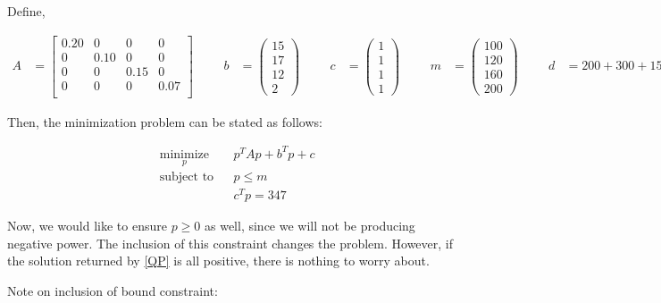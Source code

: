 \documentclass{article}
\begin{document}
Define,

\begin{align*}
A &= 
\begin{bmatrix}
	0.20 & 0 & 0 & 0  \\ 
	0 & 0.10 & 0 & 0  \\ 
	0 & 0 & 0.15 & 0  \\ 
	0 & 0 & 0 & 0.07  \\ 
\end{bmatrix}
& & &
b &= \begin{pmatrix}
15 \\ 17 \\ 12 \\ 2
\end{pmatrix}
& & &
c &= \begin{pmatrix}
1 \\ 1 \\ 1 \\ 1
\end{pmatrix}
& & &
m &= \begin{pmatrix}
100 \\ 120 \\ 160 \\ 200
\end{pmatrix}
& & &
d &= 200 +300+150+500 = 1150
\end{align*}

Then, the minimization problem can be stated as follows:

\begin{equation}\label{QP}
\begin{aligned}
& \underset{p}{\text{minimize}}
& & p^TAp + b^Tp + c \\
& \text{subject to}
& &  p \le m\\
&&& c^Tp = 347
\end{aligned}
\end{equation}

Now, we would like to ensure $p\ge 0$ as well, since we will not be producing negative power.  The inclusion of this constraint changes the problem.  However, if the solution returned by \eqref{QP} is all positive, there is nothing to worry about.

Note on inclusion of bound constraint:
%
%



\end{document}
